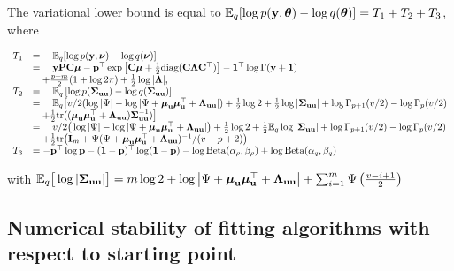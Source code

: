 \documentclass[times, doublespace]{anzsauth}
\begin{document}
	The variational lower bound is equal to ${\mathbb E}_q[\log{p({\bf y}, {\boldsymbol\theta})} - \log{q({\boldsymbol\theta})}] = T_1 + T_2 + T_3$,
	where
	
	$$
	\begin{array}{rl}
		T_1 & = \quad {\mathbb E}_q[\log{p({\bf y}, {\boldsymbol\nu})} - \log{q({\boldsymbol\nu})}]                                                                                                                                                  \\
		    & = \quad {\bf y} {\bf P} {\bf C} {\boldsymbol\mu} - {\bf p}^\top \exp{\left[ {\bf C}{\boldsymbol\mu}+  \tfrac{1}{2} \text{diag} ({\bf C}{\boldsymbol\Lambda}{\bf C}^\top) \right]} - {\bf 1}^\top\log \Gamma{({\bf y}+ {\bf1})}                                               \\
		    & \quad + \frac{p + m}{2} (1 + \log{2 \pi}) + \tfrac{1}{2} \log{|{\boldsymbol\Lambda}|},                                                                                                                                \\
		T_2 & = \quad {\mathbb E}_q \left[ \log p({\boldsymbol \Sigma}_{{\bf u} {\bf u}}) - \log q({\boldsymbol \Sigma}_{{\bf u} {\bf u}}) \right]                                                                                                                 \\
		    & = \quad {\mathbb E}_q \big[ v/2(\log |\Psi| - \log |\Psi + {\boldsymbol \mu}_{\bf u} {\boldsymbol \mu}_{\bf u}^\top + {\boldsymbol \Lambda}_{{\bf u} {\bf u}}|) + \tfrac{1}{2} \log 2 + \tfrac{1}{2} \log|{\boldsymbol \Sigma}_{{\bf u} {\bf u}}| + \log \Gamma_{p+1}(v/2) - \log \Gamma_{p}(v/2)    \\
		    & \quad + \tfrac{1}{2} \text{tr}(({\boldsymbol \mu}_{{\bf u}} {\boldsymbol \mu}_{{\bf u}}^\top + {\boldsymbol \Lambda}_{{\bf u} {\bf u}}) {\boldsymbol \Sigma}_{{\bf u} {\bf u}}^{-1}) \big]                                                                                                  \\
		    & = \quad v/2\big(\log |\Psi| - \log |\Psi + {\boldsymbol \mu}_{\bf u} {\boldsymbol \mu}_{\bf u}^\top + {\boldsymbol \Lambda}_{{\bf u} {\bf u}}|\big) + \tfrac{1}{2} \log 2 + \tfrac{1}{2} {\mathbb E}_q \log |{\boldsymbol \Sigma}_{{\bf u} {\bf u}}| + \log \Gamma_{p+1}(v/2) - \log \Gamma_{p}(v/2) \\
		    & \quad + \tfrac{1}{2} \text{tr}\big({\bf I}_m + \Psi(\Psi+ {\boldsymbol \mu}_{\bf u} {\boldsymbol \mu}_{\bf u}^\top + {\boldsymbol \Lambda}_{{\bf u} {\bf u}})^{-1}/(v + p + 2)\big)                                                                                        \\
		T_3 & = - {\bf p}^\top \log {\bf p} - ({\bf 1} - {\bf p})^\top \log ({\bf 1} - {\bf p}) - \log \text{Beta} (\alpha_\rho, \beta_\rho) + \log \text{Beta} (\alpha_q, \beta_q)                                                              
	\end{array}
	$$
	
	with ${\mathbb E}_q \big[ \log |{\boldsymbol \Sigma}_{{\bf u} {\bf u}}| \big] = m \log 2 + \log \left | \Psi + {\boldsymbol \mu}_{\bf u} {\boldsymbol \mu}_{\bf u}^\top + {\boldsymbol \Lambda}_{{\bf u} {\bf u}} \right | + \sum_{i=1}^m \Psi \left ( \frac{v - i + 1}{2} \right )$
	
	\subsection{Numerical stability of fitting algorithms with respect to starting point}
	
	
	
	
	
\end{document}
